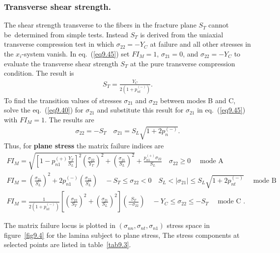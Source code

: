 \documentclass{AeroStructure-ERJohnson}
\begin{document}
\subsubsection{Transverse shear strength.} The shear strength transverse to the fibers in the fracture plane $S_T$ cannot be~deter\-mined from simple tests. Instead $S_T$ is derived from the uniaxial transverse compression test in which $\sigma_\textit{22} = -Y_C$ at failure and all other stresses in the $x_i$-system vanish. In eq.~(\ref{eq9.45}) set $\textit{FI}_M = 1$, $\sigma_{\textit{21}} = 0$, and $\sigma_{\textit{22}} = -Y_C$ to evaluate the transverse shear strength $S_T$ at the pure transverse compression condition. The result is
\begin{align}\label{eq9.49}
S_{T}=\frac{Y_{C}}{2\left(1+p_{n t}^{(-)}\right)}.
\end{align}
To find the transition values of stresses $\sigma_{\textit{21}}$ and $\sigma_{\textit{22}}$ between modes B and C, solve the eq.~(\ref{eq9.40}) for $\sigma_{\textit{21}}$ and substitute this result for $\sigma_{\textit{21}}$ in eq.~(\ref{eq9.45}) with $FI_M = 1$. The results are
\begin{align}\label{eq9.50}
\sigma_{22}=-S_{T} \quad \sigma_{21}=S_{L} \sqrt{1+2 p_{n}^{(-)}}.
\end{align}
Thus, for \textbf{plane stress} the matrix failure indices are
\begin{gather}
F I_{M}=\sqrt{\left[1-p_{n 1}^{(+)} \frac{Y_{T}}{S_{L}}\right]^{2}\left(\frac{\sigma_{22}}{Y_{T}}\right)^{2}+\left(\frac{\sigma_{21}}{S_{L}}\right)^{2}}+\frac{p_{n 1}^{(+)} \sigma_{22}}{S_{L}} \quad \sigma_{22} \geq 0 \quad \text { mode A } \label{eq9.51} \\
F I_{M}=\left(\frac{\sigma_{21}}{S_{L}}\right)^{2}+2 p_{n 1}^{(-)}\left(\frac{\sigma_{22}}{S_{L}}\right) \quad-S_{T} \leq \sigma_{22}<0 \quad S_{L}<\left|\sigma_{21}\right| \leq S_{L} \sqrt{1+2 p_{n t}^{(-)}} \quad \text { mode B} \label{eq9.52} \\
F I_{M}=\frac{1}{2\left(1+p_{n t}^{(-)}\right)}\left[\left(\frac{\sigma_{22}}{S_{T}}\right)^{2}+\left(\frac{\sigma_{21}}{S_{L}}\right)^{2}\right]\left(\frac{S_{T}}{-\sigma_{22}}\right) \quad-Y_{C} \leq \sigma_{22} \leq-S_{T} \quad \text { mode C }. \label{eq9.53}
\end{gather}

\vspace*{-1.3pc}\pagebreak

\noindent The matrix failure locus is plotted in $\left(\sigma_{n n}, \sigma_{n t}, \sigma_{n 1}\right)$ stress space in figure~\ref{fig9.4} for the lamina subject to plane stress, The stress components at selected points are listed in table~\ref{tab9.3}.
\end{document}
